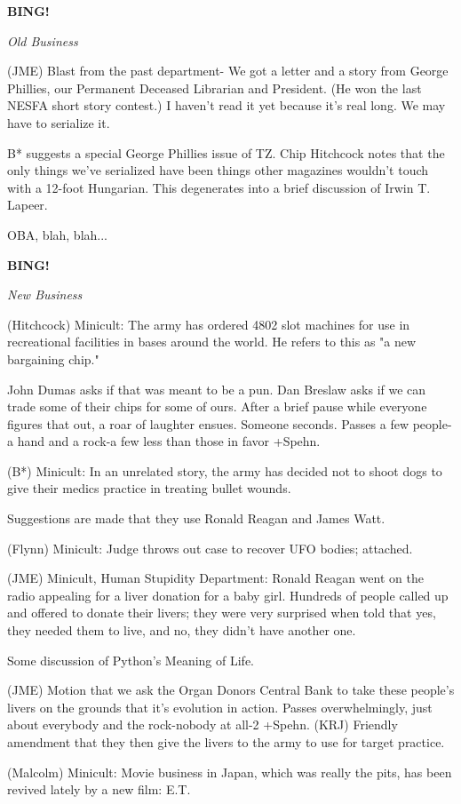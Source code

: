\documentclass[12pt]{article}
\newcommand{\bing}{{\bf BING!} }
\newcommand{\goto}[1]{\bing \vskip 12pt \centerline{{\em{#1}}}}
\begin{document}
\goto{Old Business}

(JME) Blast from the past department- We got a letter and a story from George Phillies, our Permanent Deceased Librarian and President. (He won the last NESFA short story contest.) I haven't read it yet because it's real long. We may have to serialize it.

B* suggests a special George Phillies issue of TZ. Chip Hitchcock notes that the only things we've serialized have been things other magazines wouldn't touch with a 12-foot Hungarian. This degenerates into a brief discussion of Irwin T. Lapeer.

OBA, blah, blah...

\goto{New Business}

(Hitchcock) Minicult: The army has ordered 4802 slot machines for use in recreational facilities in bases around the world. He refers to this as "a new bargaining chip."

John Dumas asks if that was meant to be a pun. Dan Breslaw asks if we can trade some of their chips for some of ours. After a brief pause while everyone figures that out, a roar of laughter ensues. Someone seconds. Passes a few people-a hand and a rock-a few less than those in favor +Spehn.

(B*) Minicult: In an unrelated story, the army has decided not to shoot dogs to give their medics practice in treating bullet wounds.

Suggestions are made that they use Ronald Reagan and James Watt.

(Flynn) Minicult: Judge throws out case to recover UFO bodies; attached.

(JME) Minicult, Human Stupidity Department: Ronald Reagan went on the radio appealing for a liver donation for a baby girl. Hundreds of people called up and offered to donate their livers; they were very surprised when told that yes, they needed them to live, and no, they didn't have another one.

Some discussion of Python's Meaning of Life.

(JME) Motion that we ask the Organ Donors Central Bank to take these people's livers on the grounds that it's evolution in action. Passes overwhelmingly, just about everybody and the rock-nobody at all-2 +Spehn. (KRJ) Friendly amendment that they then give the livers to the army to use for target practice.

(Malcolm) Minicult: Movie business in Japan, which was really the pits, has been revived lately by a new film: E.T.
\end{document}

